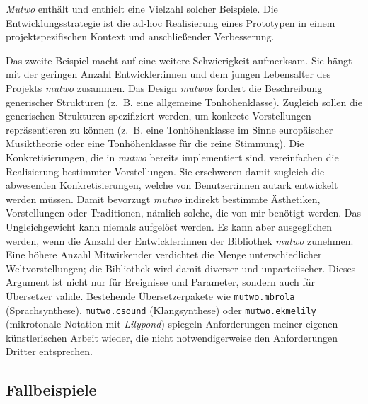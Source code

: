 \documentclass[12pt,a4paper,ngerman]{article}
\begin{document}
\smallskip

\emph{Mutwo} enthält und enthielt eine Vielzahl solcher Beispiele.
Die Entwicklungsstrategie ist die ad-hoc Realisierung eines Prototypen in einem projektspezifischen Kontext und anschließender Verbesserung.

\bigskip

Das zweite Beispiel macht auf eine weitere Schwierigkeit aufmerksam.
Sie hängt mit der geringen Anzahl Entwickler:innen und dem jungen Lebensalter des Projekts \emph{mutwo} zusammen.
Das Design \emph{mutwos} fordert die Beschreibung generischer Strukturen (z.~B. eine allgemeine Tonhöhenklasse).
Zugleich sollen die generischen Strukturen spezifiziert werden, um konkrete Vorstellungen repräsentieren zu können (z.~B. eine Tonhöhenklasse im Sinne europäischer Musiktheorie oder eine Tonhöhenklasse für die reine Stimmung).
Die Konkretisierungen, die in \emph{mutwo} bereits implementiert sind, vereinfachen die Realisierung bestimmter Vorstellungen.
Sie erschweren damit zugleich die abwesenden Konkretisierungen, welche von Benutzer:innen autark entwickelt werden müssen.
Damit bevorzugt \emph{mutwo} indirekt bestimmte Ästhetiken, Vorstellungen oder Traditionen, nämlich solche, die von mir benötigt werden.
Das Ungleichgewicht kann niemals aufgelöst werden.
Es kann aber ausgeglichen werden, wenn die Anzahl der Entwickler:innen der Bibliothek \emph{mutwo} zunehmen.
Eine höhere Anzahl Mitwirkender verdichtet die Menge unterschiedlicher Weltvorstellungen; die Bibliothek wird damit diverser und unparteiischer.
Dieses Argument ist nicht nur für Ereignisse und Parameter, sondern auch für Übersetzer valide.
Bestehende Übersetzerpakete wie \texttt{mutwo.mbrola} (Sprachsynthese), \texttt{mutwo.csound} (Klangsynthese) oder \texttt{mutwo.ekmelily} (mikrotonale Notation mit \emph{Lilypond}) spiegeln Anforderungen meiner eigenen künstlerischen Arbeit wieder, die nicht notwendigerweise den Anforderungen Dritter entsprechen.


%



\subsection{Fallbeispiele}
\end{document}

